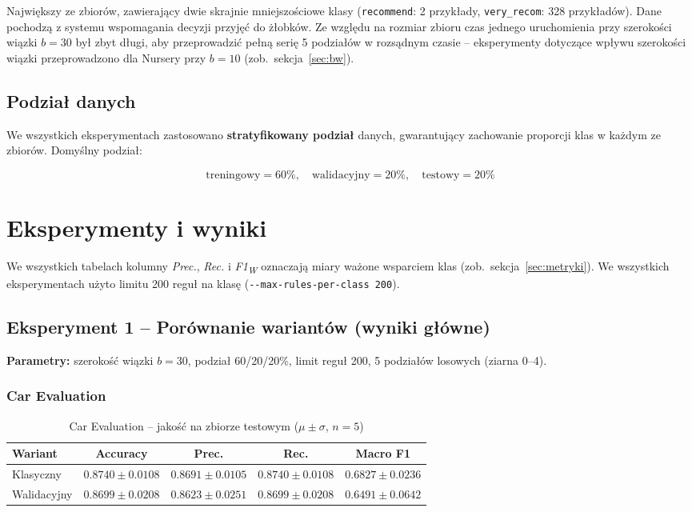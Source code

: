 \documentclass[12pt,a4paper]{article}
\begin{document}
Największy ze zbiorów, zawierający dwie skrajnie mniejszościowe klasy
(\texttt{recommend}: 2 przykłady, \texttt{very\_recom}: 328 przykładów).
Dane pochodzą z systemu wspomagania decyzji przyjęć do żłobków.
Ze względu na rozmiar zbioru czas jednego uruchomienia przy szerokości wiązki
$b = 30$ był zbyt długi, aby przeprowadzić pełną serię 5 podziałów w rozsądnym
czasie -- eksperymenty dotyczące wpływu szerokości wiązki przeprowadzono dla Nursery
przy $b = 10$ (zob.\ sekcja~\ref{sec:bw}).

\subsection{Podział danych}

We wszystkich eksperymentach zastosowano \textbf{stratyfikowany podział} danych,
gwarantujący zachowanie proporcji klas w każdym ze zbiorów.
Domyślny podział:

\[
\text{treningowy} = 60\%, \quad \text{walidacyjny} = 20\%, \quad \text{testowy} = 20\%
\]

\section{Eksperymenty i wyniki}

We wszystkich tabelach kolumny \emph{Prec.}, \emph{Rec.} i \emph{F1\textsubscript{W}}
oznaczają miary ważone wsparciem klas (zob.\ sekcja~\ref{sec:metryki}).
We wszystkich eksperymentach użyto limitu 200 reguł na klasę
(\texttt{-{}-max-rules-per-class 200}).

\subsection{Eksperyment 1 -- Porównanie wariantów (wyniki główne)}

\textbf{Parametry:} szerokość wiązki $b = 30$, podział 60/20/20\%,
limit reguł 200, 5 podziałów losowych (ziarna 0--4).

\subsubsection*{Car Evaluation}

\begin{table}[H]
\centering
\caption{Car Evaluation -- jakość na zbiorze testowym ($\mu \pm \sigma$, $n=5$)}
\begin{tabular}{lcccc}
\toprule
Wariant & Accuracy & Prec. & Rec. & Macro F1 \\
\midrule
Klasyczny   & $0.8740 \pm 0.0108$ & $0.8691 \pm 0.0105$ & $0.8740 \pm 0.0108$ & $0.6827 \pm 0.0236$ \\
Walidacyjny & $0.8699 \pm 0.0208$ & $0.8623 \pm 0.0251$ & $0.8699 \pm 0.0208$ & $0.6491 \pm 0.0642$ \\
\bottomrule
\end{tabular}
\end{table}
\end{document}
